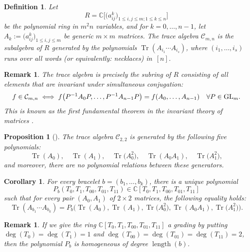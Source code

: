 \documentclass[10pt,a4paper]{amsart}
\numberwithin{equation}{section}
\newtheorem{Corollary}[Theorem]{Corollary}
\newtheorem{Proposition}[Theorem]{Proposition}
\newtheorem{Definition}[Theorem]{Definition}
\newtheorem{Remark}[Theorem]{Remark}
\DeclareMathOperator{\Tr}{Tr}
\newcommand{\CC}{\mathbb{C}}
\begin{document}
 \begin{Definition} \label{def:TraceAlgebra}
    Let
 \[
 R=\CC\big[\big(a_{ij}^k\big)_{1\leq i,j \leq m; 1 \leq k \leq n}\big]
  \]be the polynomial ring in $m^2n$ variables, and for $k=0, \dots, n-1$, let $A_k := \big(a_{ij}^k\big)_{1\leq i,j \leq m}$ be generic $m \times m$ matrices.
    The \emph{trace algebra} $\mathcal{C}_{m,n}$ is the subalgebra of $R$ generated by the polynomials $\Tr(A_{i_1}\cdots A_{i_s})$, where $(i_1,\dots,i_s)$ runs over all words (or equivalently: necklaces) in~$[n]$.
 \end{Definition}
 \begin{Remark}
    The trace algebra is precisely the subring of $R$ consisting of all elements that are invariant under simultaneous conjugation:
\[
    f \in \mathcal{C}_{m,n} \iff f\big(P^{-1}A_0P,\dots,P^{-1}A_{n-1}P\big) = f(A_0,\dots,A_{n-1}) \quad  \forall P \in {\rm GL}_m.
\]
    This is known as the \emph{first fundamental theorem} in the invariant theory of matrices \cite{procesi1976invariant, sibirskii1968algebraic}.
 \end{Remark}
 \begin{Proposition}[{\cite[Corollary 2]{sibirskii1968algebraic}}]
The trace algebra $\mathcal{C}_{2,2}$ is generated by the following five polynomials:
\[
\Tr(A_0), \quad \Tr(A_1),\quad \Tr\big(A_0^2\big),\quad \Tr(A_0A_1), \quad \Tr\big(A_1^2\big),
\]
and moreover, there are no polynomial relations between these generators.
 \end{Proposition}
 \begin{Corollary}
     For every bracelet $b=(b_1,\dots,b_k)$, there is a unique  polynomial
     \[
     P_b(T_0,T_1,T_{00},T_{01},T_{11}) \in \CC[T_0,T_1,T_{00},T_{01},T_{11}]
     \]
     such that for every pair $(A_0,A_1)$ of $2\times2$ matrices, the following equality holds:
     \begin{equation*} %
         \Tr(A_{b_1}\cdots A_{b_k}) = P_b\big(\Tr(A_0),\Tr(A_1), \Tr\big(A_0^2\big), \Tr(A_0A_1), \Tr\big(A_1^2\big)\big).
     \end{equation*}
 \end{Corollary}
 \begin{Remark} \label{rmk:multiHomog}
    If we give the ring $\CC[T_0,T_1,T_{00},T_{01},T_{11}]$ a grading by putting $\deg(T_0)=\deg(T_1)\allowbreak =1$ and $\deg(T_{00})=\deg(T_{01})=\deg(T_{11})=2$, then the polynomial $P_b$ is homogeneous of degree $\operatorname{length}(b)$.
 \end{Remark}
\end{document}
